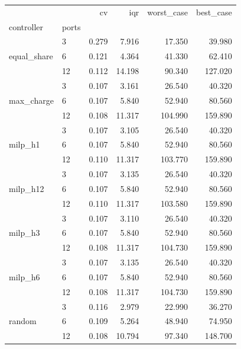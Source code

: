 \begin{tabular}{llrrrr}
\toprule
 &  & cv & iqr & worst_case & best_case \\
controller & ports &  &  &  &  \\
\midrule
\multirow[t]{3}{*}{equal_share} & 3 & 0.279 & 7.916 & 17.350 & 39.980 \\
 & 6 & 0.121 & 4.364 & 41.330 & 62.410 \\
 & 12 & 0.112 & 14.198 & 90.340 & 127.020 \\
\cline{1-6}
\multirow[t]{3}{*}{max_charge} & 3 & 0.107 & 3.161 & 26.540 & 40.320 \\
 & 6 & 0.107 & 5.840 & 52.940 & 80.560 \\
 & 12 & 0.108 & 11.317 & 104.990 & 159.890 \\
\cline{1-6}
\multirow[t]{3}{*}{milp_h1} & 3 & 0.107 & 3.105 & 26.540 & 40.320 \\
 & 6 & 0.107 & 5.840 & 52.940 & 80.560 \\
 & 12 & 0.110 & 11.317 & 103.770 & 159.890 \\
\cline{1-6}
\multirow[t]{3}{*}{milp_h12} & 3 & 0.107 & 3.135 & 26.540 & 40.320 \\
 & 6 & 0.107 & 5.840 & 52.940 & 80.560 \\
 & 12 & 0.110 & 11.317 & 103.580 & 159.890 \\
\cline{1-6}
\multirow[t]{3}{*}{milp_h3} & 3 & 0.107 & 3.110 & 26.540 & 40.320 \\
 & 6 & 0.107 & 5.840 & 52.940 & 80.560 \\
 & 12 & 0.108 & 11.317 & 104.730 & 159.890 \\
\cline{1-6}
\multirow[t]{3}{*}{milp_h6} & 3 & 0.107 & 3.135 & 26.540 & 40.320 \\
 & 6 & 0.107 & 5.840 & 52.940 & 80.560 \\
 & 12 & 0.108 & 11.317 & 104.730 & 159.890 \\
\cline{1-6}
\multirow[t]{3}{*}{random} & 3 & 0.116 & 2.979 & 22.990 & 36.270 \\
 & 6 & 0.109 & 5.264 & 48.940 & 74.950 \\
 & 12 & 0.108 & 10.794 & 97.340 & 148.700 \\
\cline{1-6}
\bottomrule
\end{tabular}
